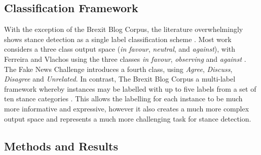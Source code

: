 \documentclass[Dissertation.tex]{subfiles}
\begin{document}
 
\subsection{Classification Framework}
With the exception of the Brexit Blog Corpus, the literature overwhelmingly shows stance detection as a single label classification scheme \cite{ferreiraEmergentNovelDataset2016,respallStanceDetectionCatalan,hanselowskiRetrospectiveAnalysisFake2018,mohammadSemEval2016TaskDetecting2016,swamiEnglishHindiCodeMixedCorpus2018,somasundaranRecognizingStancesIdeological2010,hasanExtraLinguisticConstraintsStance,duStanceClassificationTargetspecific,augensteinStanceDetectionBidirectional2016,sobhaniStanceDetectionAnalysis}. Most work considers a three class output space (\textit{in favour}, \textit{neutral}, and \textit{against})\cite{ferreiraEmergentNovelDataset2016,respallStanceDetectionCatalan,mohammadSemEval2016TaskDetecting2016,swamiEnglishHindiCodeMixedCorpus2018,somasundaranRecognizingStancesIdeological2010,hasanExtraLinguisticConstraintsStance,duStanceClassificationTargetspecific,augensteinStanceDetectionBidirectional2016,sobhaniStanceDetectionAnalysis}, with Ferreira and Vlachos using the three classes \textit{in favour}, \textit{observing} and \textit{against} \cite{ferreiraEmergentNovelDataset2016}. The Fake News Challenge introduces a fourth class, using \textit{Agree}, \textit{Discuss}, \textit{Disagree} and \textit{Unrelated}. In contrast, The Brexit Blog Corpus a multi-label framework whereby instances may be labelled with up to five labels from a set of ten stance categories \cite{simakiAnnotatingSpeakerStance2017}. This allows the labelling for each instance to be much more informative and expressive, however it also creates a much more complex output space and represents a much more challenging task for stance detection.
\subsection{Methods and Results}
\end{document}
